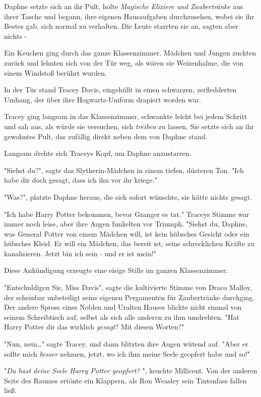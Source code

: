 {Daphne setzte sich an ihr Pult, holte \emph{Magische} \emph{Elixiere} \emph{und Zaubertränke} aus ihrer Tasche und begann, ihre eigenen Hausaufgaben durchzusehen, wobei sie ihr Bestes gab, sich normal zu verhalten. Die Leute starrten sie an, sagten aber nichts -

Ein Keuchen ging durch das ganze Klassenzimmer. Mädchen und Jungen zuckten zurück und lehnten sich von der Tür weg, als wären sie Weizenhalme, die von einem Windstoß berührt wurden.

In der Tür stand Tracey Davis, eingehüllt in einen schwarzen, zerfledderten Umhang, der über ihre Hogwarts-Uniform drapiert worden war.

Tracey ging langsam in das Klassenzimmer, schwankte leicht bei jedem Schritt und sah aus, als würde sie versuchen, sich \emph{treiben} zu lassen. Sie setzte sich an ihr gewohntes Pult, das zufällig direkt neben dem von Daphne stand.

Langsam drehte sich Traceys Kopf, um Daphne anzustarren.

"Siehst du?", sagte das Slytherin-Mädchen in einem tiefen, düsteren Ton. "Ich habe dir doch gesagt, dass ich ihn vor ihr kriege."

"Was?", platzte Daphne heraus, die sich sofort wünschte, sie hätte nichts gesagt.

"Ich habe Harry Potter bekommen, bevor Granger es tat." Traceys Stimme war immer noch leise, aber ihre Augen funkelten vor Triumph. "Siehst du, Daphne, was General Potter von einem Mädchen will, ist kein hübsches Gesicht oder ein hübsches Kleid. Er will ein Mädchen, das bereit ist, seine schrecklichen Kräfte zu kanalisieren. Jetzt bin ich sein - und er ist mein!"

Diese Ankündigung erzeugte eine eisige Stille im ganzen Klassenzimmer.

"Entschuldigen Sie, Miss Davis", sagte die kultivierte Stimme von Draco Malfoy, der scheinbar unbeteiligt seine eigenen Pergamenten für Zaubertränke durchging. Der andere Spross eines Noblen und Uralten Hauses blickte nicht einmal von seinem Schreibtisch auf, selbst als sich alle anderen zu ihm umdrehten. "Hat Harry Potter dir das wirklich \emph{gesagt}? Mit diesen Worten?"

"Nun, nein…" sagte Tracey, und dann blitzten ihre Augen wütend auf. "Aber er sollte mich \emph{besser} nehmen, jetzt, wo ich ihm meine Seele geopfert habe und so!"

"\emph{Du hast deine Seele Harry Potter geopfert?} ", keuchte Millicent. Von der anderen Seite des Raumes ertönte ein Klappern, als Ron Weasley sein Tintenfass fallen ließ.

}

